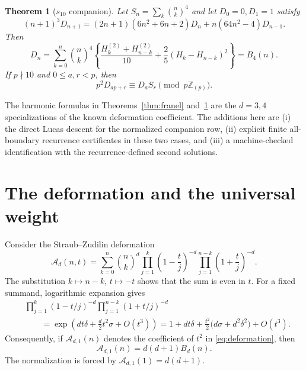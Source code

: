\documentclass[11pt,reqno]{amsart}
\newtheorem{theorem}{Theorem}[section]
\theoremstyle{definition}
\theoremstyle{remark}
\newcommand{\Zp}{\mathbb Z_{(p)}}
\newcommand{\bin}[2]{\binom{#1}{#2}}
\newcommand{\Hd}[2]{H_{#1}^{(#2)}}
\begin{document}
\begin{theorem}[$s_{10}$ companion]\label{thm:s10}
Let $S_n=\sum_k\bin nk^4$ and let $D_0=0,D_1=1$ satisfy
\begin{equation}\label{eq:s10rec}
 (n+1)^3D_{n+1}=(2n+1)(6n^2+6n+2)D_n
                 +n(64n^2-4)D_{n-1}.
\end{equation}
Then
\begin{equation}\label{eq:s10form}
 D_n=\sum_{k=0}^n\bin nk^4
 \left\{\frac{\Hd k2+\Hd{n-k}2}{10}
       +\frac25(H_k-H_{n-k})^2\right\}=B_4(n).
\end{equation}
If $p\nmid10$ and $0\leq a,r<p$, then
\begin{equation}\label{eq:s10lucas}
 p^2D_{ap+r}\equiv D_aS_r\pmod {p\Zp}.
\end{equation}
\end{theorem}

The harmonic formulas in Theorems~\ref{thm:franel} and~\ref{thm:s10} are the
$d=3,4$ specializations of the known deformation coefficient.  The additions
here are (i) the direct Lucas descent for the normalized companion row,
(ii) explicit finite all-boundary recurrence certificates in these two cases,
and (iii) a machine-checked identification with the recurrence-defined second
solutions.

\section{The deformation and the universal weight}

Consider the Straub--Zudilin deformation
\begin{equation}\label{eq:deformation}
 \mathcal A_d(n,t)=\sum_{k=0}^n\bin nk^d
 \prod_{j=1}^k\left(1-\frac tj\right)^{-d}
 \prod_{j=1}^{n-k}\left(1+\frac tj\right)^{-d}.
\end{equation}
The substitution $k\mapsto n-k$, $t\mapsto-t$ shows that the sum is even in
$t$.  For a fixed summand, logarithmic expansion gives
\[
 \begin{split}
 &\prod_{j=1}^k(1-t/j)^{-d}
  \prod_{j=1}^{n-k}(1+t/j)^{-d}\\
 &\qquad=\exp\left(dt\delta+\frac d2t^2\sigma+O(t^3)\right)
 =1+dt\delta+\frac{t^2}{2}\bigl(d\sigma+d^2\delta^2\bigr)+O(t^3).
 \end{split}
\]
Consequently, if $\mathcal A_{d,1}(n)$ denotes the coefficient of $t^2$ in
\eqref{eq:deformation}, then
\begin{equation}\label{eq:coefficient}
 \mathcal A_{d,1}(n)=d(d+1)B_d(n).
\end{equation}
The normalization is forced by $\mathcal A_{d,1}(1)=d(d+1)$.
\end{document}
